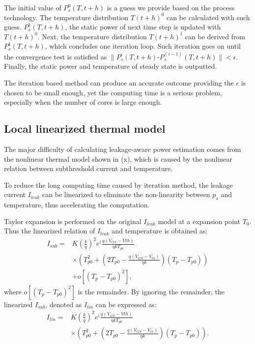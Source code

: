 The initial value of $P^0_s(T,t+h)$ is a guess we provide based on the process technology. The temperature distribution $T(t+h)^0$ can be calculated with such guess. $P^1_s(T,t+h)$, the static power of next time step is updated with $T(t+h)^0$. Next, the temperature distribution $T(t+h)^1$ can be derived from $P^1_s(T,t+h)$, which concludes one iteration loop. Such iteration goes on until the convergence test is satisfied as $\parallel P^i_s(T,t+h)$-$P^(i-1)_s(T,t+h)\parallel<\epsilon$. Finally, the static power and temperature of steady state is outputted.

The iteration based method can produce an accurate outcome providing the $\epsilon$ is chosen to be small enough, yet the computing time is a serious problem, especially when the number of cores is large enough.

\subsection{Local linearized thermal model}
The major difficulty of calculating leakage-aware power estimation comes from the nonlinear thermal model shown in (x), which is caused by the nonlinear relation between subthreshold current and temperature.

To reduce the long computing time caused by iteration method, the leakage current $I_{leak}$ can be linearized to eliminate the non-linearity between $p_{s}$ and temperature, thus accelerating the computation.

Taylor expansion is performed on the original $I_{leak}$ model at a expansion point $T_{0}$. Thus the linearized relation of $I_{leak}$ and temperature is obtained as:
\begin{equation}\label{linear_subthreshold}
\begin{split}
I_{sub} = &K(\frac{k}{q})^{2}e^(\frac{q(V_{GS}-V{th})}{\eta kT_{p0}}\\
&\times (T_{p0}^{2}+(2T_{p0}-\frac{q(V_{GS}-V_{th})}{\eta k})(T_{p}-T_{p0}))\\
&+ o[(T_{p}-T_{p0})^{2}],
\end{split}
\end{equation}
where $o[(T_{p}-T_{p0})^{2}]$ is the remainder. By ignoring the remainder, the linearized $I_{sub}$, denoted as $I_{lin}$ can be expressed as:
\begin{equation}\label{linear_subthreshold}
\begin{split}
I_{lin} = &K(\frac{k}{q})^{2}e^(\frac{q(V_{GS}-V{th})}{\eta kT_{p0}}\\
&\times (T_{p0}^{2}+(2T_{p0}-\frac{q(V_{GS}-V_{th})}{\eta k})(T_{p}-T_{p0})).
\end{split}
\end{equation}

